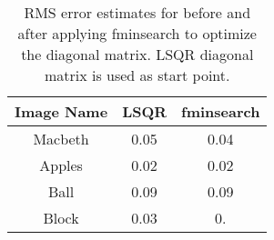 \documentclass[12pt]{report}
\begin{document}
\begin{enumerate}
    \begin{table}[h!]
    \begin{center}
    \begin{tabular}{ | c | c | c | } 
        \hline
        Image Name & LSQR & fminsearch \\ 
        \hline \hline
        Macbeth & 0.05 & 0.04 \\  
        Apples & 0.02 & 0.02 \\ 
        Ball & 0.09 & 0.09 \\ 
        Block & 0.03 & 0. \\ 
        \hline
    \end{tabular}
    \caption{RMS error estimates for before and after applying fminsearch to optimize the diagonal matrix. LSQR diagonal matrix is used as start point.}
    \label{tab:Table5}
    \end{center}
    \end{table}
    

\end{enumerate}
\end{document}
